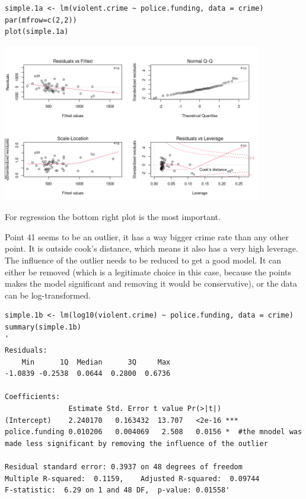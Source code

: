 \documentclass{article}
\begin{document}
\begin{lstlisting}
simple.1a <- lm(violent.crime ~ police.funding, data = crime)
par(mfrow=c(2,2)) 
plot(simple.1a)
\end{lstlisting}

\begin{center}
\includegraphics[width = 0.85\textwidth]{lab3/plot-vcrime-vs-police.png}
\end{center}


For regression the bottom right plot is the most important.\par 
Point 41 seems to be an outlier, it has a way bigger crime rate than any other point. It is outside cook's distance, which means it also has a very high leverage. The influence of the outlier needs to be reduced to get a good model. It can either be removed (which is a legitimate choice in this case, because the points makes the model significant and removing it would be conservative), or the data can be log-transformed.

\begin{lstlisting}
simple.1b <- lm(log10(violent.crime) ~ police.funding, data = crime)
summary(simple.1b)
'
Residuals:
    Min      1Q  Median      3Q     Max 
-1.0839 -0.2538  0.0644  0.2800  0.6736 

Coefficients:
               Estimate Std. Error t value Pr(>|t|)    
(Intercept)    2.240170   0.163432  13.707   <2e-16 ***
police.funding 0.010206   0.004069   2.508   0.0156 *  #the mnodel was made less significant by removing the influence of the outlier 

Residual standard error: 0.3937 on 48 degrees of freedom
Multiple R-squared:  0.1159,	Adjusted R-squared:  0.09744 
F-statistic:  6.29 on 1 and 48 DF,  p-value: 0.01558'
\end{lstlisting}
\end{document}
